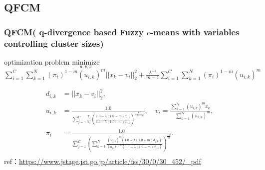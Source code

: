 \documentclass[fleqn,dvipdfmx,10pt]{beamer}
\begin{document}
\subsection{QFCM}
\begin{frame}\frametitle{QFCM\scriptsize(%
    q-divergence based Fuzzy $c$-means with variables controlling cluster sizes)}
  \begin{block}{optimization problem}
    $\underset{u,v,\pi}{\text{minimize}}$
    $\sum_{i=1}^C\sum_{k=1}^N(\pi_{i})^{1-m}(u_{i,k})^m||x_k-v_i||_2^2+\frac{\lambda^{-1}}{m-1}\sum_{i=1}^C\sum_{k=1}^N(\pi_{i})^{1-m}(u_{i,k})^m$\centering\\
  \end{block}
  \begin{align*}
    d_{i,k}&=||x_{k}-v_{i}||_{2}^2, \\
    u_{i,k}&=\frac{1.0}{\sum_{j=1}^C\frac{\pi_{j}}{\pi_{i}}\left(\frac{1.0-\lambda(1.0-m)d_{j,k}}{1.0-\lambda(1.0-m)d_{i,k}}\right)^{\frac{1.0}{1.0-m}}},\quad
    v_{i}=\frac{\sum_{k=1}^N(u_{i,k})^mx_{k}}{\quad\sum_{k=1}^N(u_{i,k})^{m}},\\
    \pi_{i}&=\frac{1.0}{\sum_{j=1}^C\left(\sum_{k=1}^N\frac{(u_{j,k})^m(1.0-\lambda(1.0-m)d_{j,k})}{(u_i,k)^m(1.0-\lambda(1.0-m)d_{i,k})}\right)^{\frac{1.0}{m}}}.\\
  \end{align*}
  ref：\url{https://www.jstage.jst.go.jp/article/fss/30/0/30_452/_pdf}\centering
\end{frame}
\end{document}
